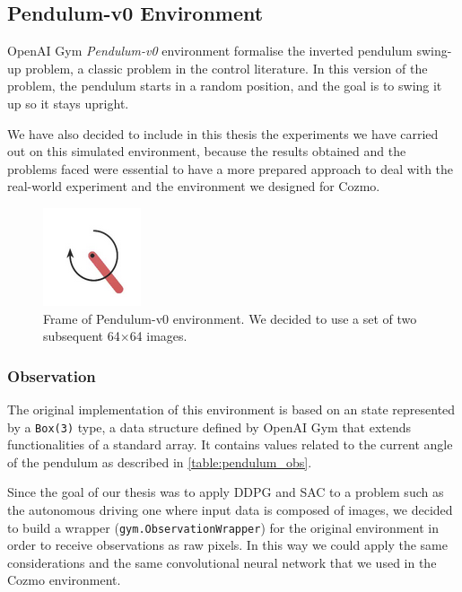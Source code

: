 \subsection{Pendulum-v0 Environment}

OpenAI Gym \textit{Pendulum-v0} environment formalise the inverted pendulum swing-up problem, a classic problem in the control literature. In this version of the problem, the pendulum starts in a random position, and the goal is to swing it up so it stays upright.

We have also decided to include in this thesis the experiments we have carried out on this simulated environment, because the results obtained and the problems faced were essential to have a more prepared approach to deal with the real-world experiment and the environment we designed for Cozmo.

\begin{figure}[ht!]
	\centering
	\includegraphics[height=0.2\paperwidth]{img/pendulum.png}
	\caption[Frame of Pendulum-v0 environment]{Frame of Pendulum-v0 environment. We decided to use a set of two subsequent 64$\times$64 images.}
	\label{fig:pendulum}
\end{figure}

\subsubsection{Observation}

The original implementation of this environment is based on an state represented by a \texttt{Box(3)} type, a data structure defined by OpenAI Gym that extends functionalities of a standard array. It contains values related to the current angle of the pendulum as described in \vref{table:pendulum_obs}.

Since the goal of our thesis was to apply DDPG and SAC to a problem such as the autonomous driving one where input data is composed of images, we decided to build a wrapper (\texttt{gym.ObservationWrapper}) for the original environment in order to receive observations as raw pixels. In this way we could apply the same considerations and the same convolutional neural network that we used in the Cozmo environment.

